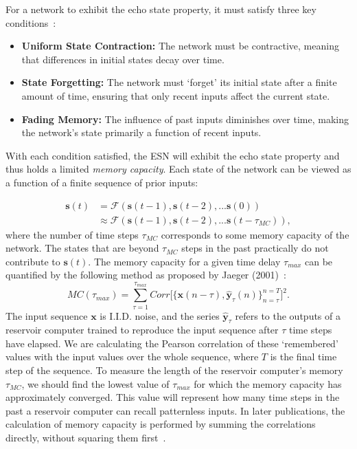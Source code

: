 For a network to exhibit the echo state property, it must satisfy three key conditions~\cite{buehner_young_2006}:
\begin{itemize}
    \item \textbf{Uniform State Contraction:} The network must be contractive, meaning that differences in initial states decay over time.
    \item \textbf{State Forgetting:} The network must `forget' its initial state after a finite amount of time, ensuring that only recent inputs affect the current state.
    \item \textbf{Fading Memory:} The influence of past inputs diminishes over time, making the network's state primarily a function of recent inputs.
\end{itemize}

With each condition satisfied, the ESN will exhibit the echo state property and thus holds a limited \textit{memory capacity}. Each state of the network can be viewed as a function of a finite sequence of prior inputs:

\begin{align*}
\mathbf{s}(t) &= \mathcal{F}(\mathbf{s}(t-1), \mathbf{s}(t-2), ... \mathbf{s}(0)) \\
&\approx \mathcal{F}(\mathbf{s}(t-1), \mathbf{s}(t-2), ... \mathbf{s}(t-\tau_{MC})),
\end{align*}
where the number of time steps $\tau_{MC}$ corresponds to some memory capacity of the network. The states that are beyond $\tau_{MC}$ steps in the past practically do not contribute to $\mathbf{s}(t)$. The memory capacity for a given time delay $\tau_{max}$ can be quantified by the following method as proposed by Jaeger (2001)~\cite{jaeger_2001}:
\begin{equation*}
    MC(\tau_{max}) = \sum^{\tau_{max}}_{\tau=1} Corr\bigg[\big\{\mathbf{x}(n-\tau), \mathbf{\hat{y}}_\tau(n)\big\}_{n=\tau}^{n=T}\bigg]^2.
\end{equation*}
The input sequence $\mathbf{x}$ is I.I.D. noise, and the series $\mathbf{\hat{y}}_\tau$ refers to the outputs of a reservoir computer trained to reproduce the input sequence after $\tau$ time steps have elapsed. We are calculating the Pearson correlation of these `remembered' values with the input values over the whole sequence, where $T$ is the final time step of the sequence. To measure the length of the reservoir computer's memory $\tau_{MC}$, we should find the lowest value of $\tau_{max}$ for which the memory capacity has approximately converged. This value will represent how many time steps in the past a reservoir computer can recall patternless inputs. In later publications, the calculation of memory capacity is performed by summing the correlations directly, without squaring them first~\cite{lukosevicius_and_jaeger_2009}.


